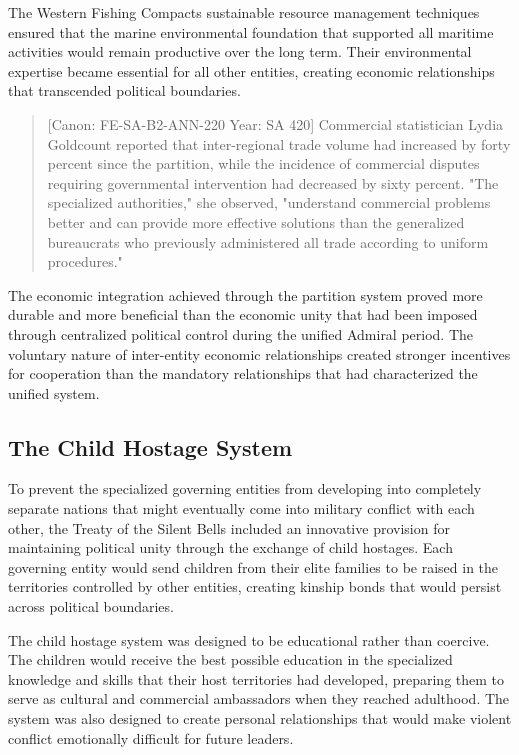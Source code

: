 The Western Fishing Compact\textquotesingle s sustainable resource
management techniques ensured that the marine environmental foundation
that supported all maritime activities would remain productive over the
long term. Their environmental expertise became essential for all other
entities, creating economic relationships that transcended political
boundaries.

\begin{quote}
{[}Canon: FE-SA-B2-ANN-220 \textbar{} Year: SA 420{]} Commercial
statistician Lydia Goldcount reported that inter-regional trade volume
had increased by forty percent since the partition, while the incidence
of commercial disputes requiring governmental intervention had decreased
by sixty percent. "The specialized authorities," she observed,
"understand commercial problems better and can provide more effective
solutions than the generalized bureaucrats who previously administered
all trade according to uniform procedures."
\end{quote}

The economic integration achieved through the partition system proved
more durable and more beneficial than the economic unity that had been
imposed through centralized political control during the unified Admiral
period. The voluntary nature of inter-entity economic relationships
created stronger incentives for cooperation than the mandatory
relationships that had characterized the unified system.

\subsection{The Child Hostage System}\label{the-child-hostage-system}

To prevent the specialized governing entities from developing into
completely separate nations that might eventually come into military
conflict with each other, the Treaty of the Silent Bells included an
innovative provision for maintaining political unity through the
exchange of child hostages. Each governing entity would send children
from their elite families to be raised in the territories controlled by
other entities, creating kinship bonds that would persist across
political boundaries.

The child hostage system was designed to be educational rather than
coercive. The children would receive the best possible education in the
specialized knowledge and skills that their host territories had
developed, preparing them to serve as cultural and commercial
ambassadors when they reached adulthood. The system was also designed to
create personal relationships that would make violent conflict
emotionally difficult for future leaders.

